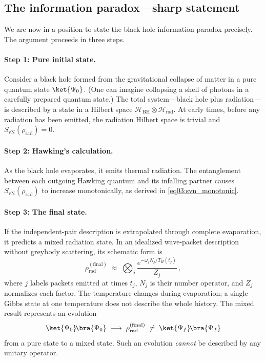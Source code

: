 \documentclass[11pt,letterpaper]{article}
\theoremstyle{plain}
\theoremstyle{definition}
\theoremstyle{remark}
\newcommand{\Hcal}{\mathcal{H}}
\begin{document}
\subsection{The information paradox---sharp statement}
\label{subsec03:information_paradox}

We are now in a position to state the black hole information paradox
precisely.  The argument proceeds in three steps.

\paragraph{Step 1: Pure initial state.}
Consider a black hole formed from the gravitational collapse of matter
in a pure quantum state $\ket{\Psi_{0}}$.  (One can imagine collapsing
a shell of photons in a carefully prepared quantum state.)  The total
system---black hole plus radiation---is described by a state in a
Hilbert space $\Hcal_{\mathrm{BH}} \otimes \Hcal_{\mathrm{rad}}$.
At early times, before any radiation has been emitted, the radiation
Hilbert space is trivial and $S_{\mathrm{vN}}(\rho_{\mathrm{rad}}) = 0$.

\paragraph{Step 2: Hawking's calculation.}
As the black hole evaporates, it emits thermal radiation.  The
entanglement between each outgoing Hawking quantum and its infalling
partner causes $S_{\mathrm{vN}}(\rho_{\mathrm{rad}})$ to increase
monotonically, as derived in \eqref{eq03:svn_monotonic}.

\paragraph{Step 3: The final state.}
If the independent-pair description is extrapolated through complete
evaporation, it predicts a mixed radiation state. In an idealized
wave-packet description without greybody scattering, its schematic form is
\begin{equation}\label{eq03:rho_thermal_final}
  \rho_{\mathrm{rad}}^{(\mathrm{final})}
  \;\approx\; \bigotimes_j \frac{e^{-\omega_j N_j/T_H(t_j)}}{Z_j}\,,
\end{equation}
where $j$ labels packets emitted at times $t_j$, $N_j$ is their number
operator, and $Z_j$ normalizes each factor. The temperature changes during
evaporation; a single Gibbs state at one temperature does not describe the
whole history. The mixed result represents an evolution
\begin{equation}\label{eq03:pure_to_mixed}
  \ket{\Psi_{0}}\!\bra{\Psi_{0}} \;\longrightarrow\;
  \rho_{\mathrm{rad}}^{(\mathrm{final})}
  \;\neq\; \ket{\Psi_{f}}\!\bra{\Psi_{f}}
\end{equation}
from a pure state to a mixed state.  Such an evolution \emph{cannot}
be described by any unitary operator.
\end{document}
